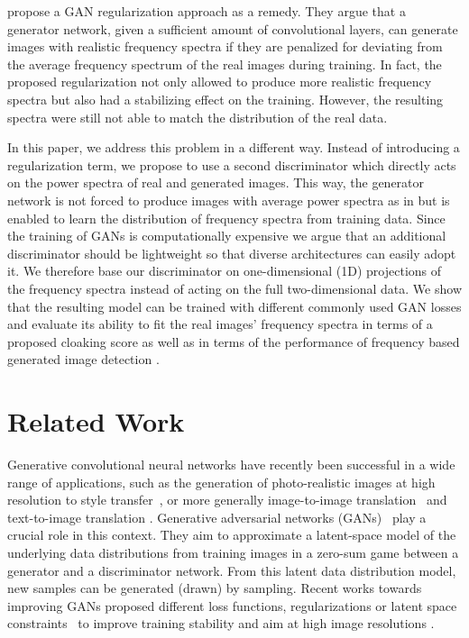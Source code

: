 \documentclass[letterpaper]{article} %
\begin{document}
\citet{margret2020upconvolution} propose a GAN regularization approach as a remedy. They argue that a generator network, given a sufficient amount of convolutional layers, can generate images with realistic frequency spectra if they are penalized for deviating from the average frequency spectrum of the real images during training. In fact, the proposed regularization not only allowed to produce more realistic frequency spectra but also had a stabilizing effect on the training.
However, the resulting spectra were still not able to match the distribution of the real data.

In this paper, we address this problem in a different way. Instead of introducing a regularization term, we propose to use a second discriminator which directly acts on the power spectra of real and generated images. This way, the generator network is not forced to produce images with average power spectra as in \cite{margret2020upconvolution} but is enabled to learn the distribution of frequency spectra from training data.
Since the training of GANs is computationally expensive we argue that an additional discriminator should be lightweight so that diverse architectures can easily adopt it. We therefore base our discriminator on one-dimensional (1D) projections of the frequency spectra instead of acting on the full two-dimensional data. We show that the resulting model can be trained with different commonly used GAN losses and evaluate its ability to fit the real images' frequency spectra in terms of a proposed cloaking score as well as in terms of the performance of frequency based generated image detection \cite{margret2020upconvolution}.

\section{Related Work}
Generative convolutional neural networks have recently been successful in a wide range of applications, such as the generation of photo-realistic images at high resolution \cite{karras2017ProGAN,brock2018large,karras2019StyleGAN,karras2019StyleGAN2} to style transfer~\cite{isola2017image,zhu2017unpaired,zhu2017toward,huang2018multimodal}, or more generally image-to-image translation~\cite{pathak2016context,iizuka2017globally,zhu2017toward,choi2018stargan,mo2018instanceaware,karras2019style} and text-to-image translation \cite{reed2016generative,dai2017towards,zhang2017stackgan,zhang2018stackgan++}.
Generative adversarial networks (GANs)~\cite{gan14nips} play a crucial role in this context. They aim to approximate a latent-space model of the underlying data distributions from training images in a zero-sum game between a generator and a discriminator network. From this latent data distribution model, new samples can be generated (drawn) by sampling. Recent works towards improving GANs proposed different loss functions, regularizations or latent space constraints~\cite{gulrajani2017wgan,mao2017least,gulrajani2017improved,miyato2018spectral_norm,mirza2014conditional,donahue2016adversarial,gurumurthy2017deligan,margret2020upconvolution,brock2018BigGAN,kodali2017convergence} to improve training stability and aim at high image resolutions  \cite{karras2017ProGAN,karras2019StyleGAN,karras2019StyleGAN2}.
\end{document}
